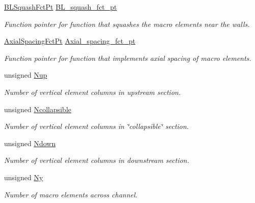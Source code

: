 \begin{DoxyCompactItemize}
\item 
\hyperlink{classoomph_1_1CollapsibleChannelDomain_a2bf1d7943bfac134a5c27a54c7e1faed}{B\+L\+Squash\+Fct\+Pt} \hyperlink{classoomph_1_1CollapsibleChannelDomain_a3d3f5d77c3221da20cd02bf02be800b7}{B\+L\+\_\+squash\+\_\+fct\+\_\+pt}
\begin{DoxyCompactList}\small\item\em Function pointer for function that squashes the macro elements near the walls. \end{DoxyCompactList}\item 
\hyperlink{classoomph_1_1CollapsibleChannelDomain_a317472dab112beac771ecf6442a465f5}{Axial\+Spacing\+Fct\+Pt} \hyperlink{classoomph_1_1CollapsibleChannelDomain_a6f4c3319be685553715f5cd776eea0fc}{Axial\+\_\+spacing\+\_\+fct\+\_\+pt}
\begin{DoxyCompactList}\small\item\em Function pointer for function that implements axial spacing of macro elements. \end{DoxyCompactList}\item 
unsigned \hyperlink{classoomph_1_1CollapsibleChannelDomain_a16bef61c4223f92cb1b0c35e9a7ea7d2}{Nup}
\begin{DoxyCompactList}\small\item\em Number of vertical element columns in upstream section. \end{DoxyCompactList}\item 
unsigned \hyperlink{classoomph_1_1CollapsibleChannelDomain_a607c389c3f0c06f0240d97aaca65cdf7}{Ncollapsible}
\begin{DoxyCompactList}\small\item\em Number of vertical element columns in \char`\"{}collapsible\char`\"{} section. \end{DoxyCompactList}\item 
unsigned \hyperlink{classoomph_1_1CollapsibleChannelDomain_a1f9c92507803d56e12cf5cb24b11cd83}{Ndown}
\begin{DoxyCompactList}\small\item\em Number of vertical element columns in downstream section. \end{DoxyCompactList}\item 
unsigned \hyperlink{classoomph_1_1CollapsibleChannelDomain_a13c992ef93891493c5da50afff67d38c}{Ny}
\begin{DoxyCompactList}\small\item\em Number of macro elements across channel. \end{DoxyCompactList}\item 

\end{DoxyCompactItemize}
